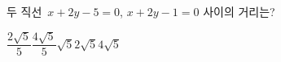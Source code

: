 두 직선~$x+2y-5=0$, $x+2y-1=0$ 사이의 거리는?
\begin{choices32}{$\dfrac{2\sqrt{5}}{5}$}{$\dfrac{4\sqrt{5}}{5}$}{$\sqrt{5}$}{$2\sqrt{5}$}{$4\sqrt{5}$}\end{choices32}
